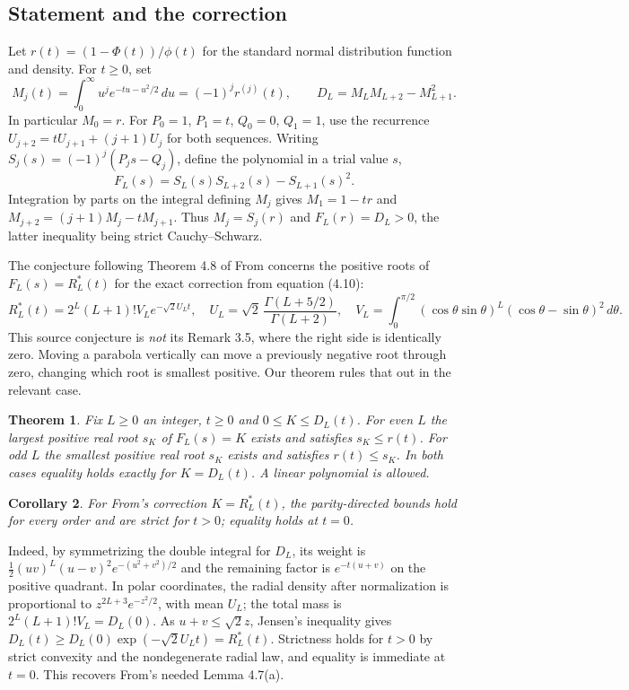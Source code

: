 \documentclass[11pt,a4paper]{article}
\numberwithin{equation}{section}
\newtheorem{theorem}{Theorem}[section]
\newtheorem{corollary}[theorem]{Corollary}
\theoremstyle{definition}
\theoremstyle{remark}
\begin{document}
\subsection{Statement and the correction}
Let $r(t)=(1-\Phi(t))/\phi(t)$ for the standard normal distribution function and density. For $t\ge0$, set
\[
 M_j(t)=\int_0^\infty u^j e^{-tu-u^2/2}\,du=(-1)^j r^{(j)}(t),\qquad
 D_L=M_L M_{L+2}-M_{L+1}^2 .
\]
In particular $M_0=r$. For $P_0=1$, $P_1=t$, $Q_0=0$, $Q_1=1$, use the recurrence
$U_{j+2}=tU_{j+1}+(j+1)U_j$ for both sequences. Writing $S_j(s)=(-1)^j(P_js-Q_j)$, define the polynomial in a trial value $s$,
\[
 F_L(s)=S_L(s)S_{L+2}(s)-S_{L+1}(s)^2 .
\]
Integration by parts on the integral defining $M_j$ gives $M_1=1-tr$ and
$M_{j+2}=(j+1)M_j-tM_{j+1}$. Thus $M_j=S_j(r)$ and $F_L(r)=D_L>0$, the latter inequality being strict Cauchy--Schwarz.

The conjecture following Theorem 4.8 of From \cite{r35showa:from} concerns the positive roots of
$F_L(s)=R^*_L(t)$ for the exact correction from equation (4.10):
\[
 R^*_L(t)=2^L(L+1)!V_L e^{-\sqrt2 U_L t},\quad
 U_L=\sqrt2\,\frac{\Gamma(L+5/2)}{\Gamma(L+2)},\quad
 V_L=\int_0^{\pi/2}(\cos\theta\sin\theta)^L
 (\cos\theta-\sin\theta)^2\,d\theta .
\]
This source conjecture is \emph{not} its Remark 3.5, where the right side is identically zero. Moving a parabola vertically can move a previously negative root through zero, changing which root is smallest positive. Our theorem rules that out in the relevant case.
\begin{theorem}
Fix $L\ge0$ an integer, $t\ge0$ and $0\le K\le D_L(t)$. For even $L$ the largest positive real root $s_K$ of $F_L(s)=K$ exists and satisfies $s_K\le r(t)$. For odd $L$ the smallest positive real root $s_K$ exists and satisfies $r(t)\le s_K$. In both cases equality holds exactly for $K=D_L(t)$. A linear polynomial is allowed.
\end{theorem}
\begin{corollary}
For From's correction $K=R^*_L(t)$, the parity-directed bounds hold for every order and are strict for $t>0$; equality holds at $t=0$.
\end{corollary}
Indeed, by symmetrizing the double integral for $D_L$, its weight is
$\tfrac12 (uv)^L(u-v)^2e^{-(u^2+v^2)/2}$ and the remaining factor is $e^{-t(u+v)}$ on the positive quadrant. In polar coordinates, the radial density after normalization is proportional to $z^{2L+3}e^{-z^2/2}$, with mean $U_L$; the total mass is $2^L(L+1)!V_L=D_L(0)$. As $u+v\le\sqrt2 z$, Jensen's inequality gives
$D_L(t)\ge D_L(0)\exp(-\sqrt2 U_Lt)=R^*_L(t)$. Strictness holds for $t>0$ by strict convexity and the nondegenerate radial law, and equality is immediate at $t=0$. This recovers From's needed Lemma 4.7(a).
\end{document}
